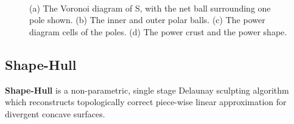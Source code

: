 \documentclass[preprint,5p,times,twocolumn]{elsarticle}
\begin{document}
\begin{itemize}
\begin{figure}[!h]
{	}\\
	\caption{
		(a) The Voronoi diagram of S, with the net ball surrounding one pole shown. (b) The inner and outer polar balls. (c) The power diagram cells of the poles. (d) The power crust and the power shape.
	}
\end{figure}
\end{itemize}

\subsection{Shape-Hull}
\textbf{Shape-Hull}\cite{Peethambaran:2015:RWS:2941001.2941130} is a non-parametric, single stage Delaunay sculpting algorithm which reconstructs topologically correct piece-wise linear approximation for divergent concave surfaces.
\end{document}

